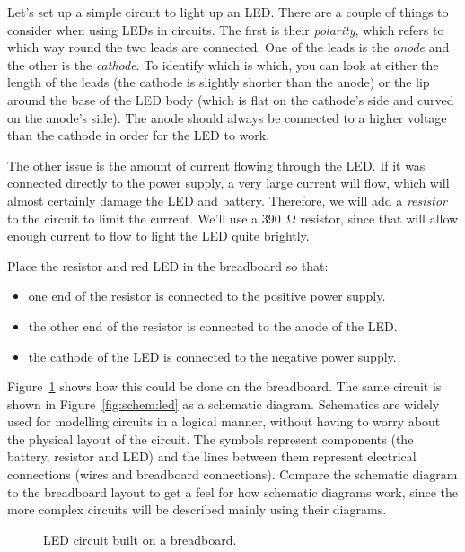 \documentclass{article}
\begin{document}
Let's set up a simple circuit to light up an LED. There are a couple of things
to consider when using LEDs in circuits. The first is their \emph{polarity},
which refers to which way round the two leads are connected. One of the leads
is the \emph{anode} and the other is the \emph{cathode}. To identify which is
which, you can look at either the length of the leads (the cathode is slightly
shorter than the anode) or the lip around the base of the LED body (which is
flat on the cathode's side and curved on the anode's side). The anode should
always be connected to a higher voltage than the cathode in order for the LED
to work.

The other issue is the amount of current flowing through the LED. If it was
connected directly to the power supply, a very large current will flow, which
will almost certainly damage the LED and battery. Therefore, we will add a
\emph{resistor} to the circuit to limit the current. We'll use a
\SI{390}{\ohm} resistor, since that will allow enough current to flow to light
the LED quite brightly.

Place the resistor and red LED in the breadboard so that:

\begin{itemize}
\item one end of the resistor is connected to the positive power supply.
\item the other end of the resistor is connected to the anode of the LED.
\item the cathode of the LED is connected to the negative power supply.
\end{itemize}

Figure~\ref{fig:breadboard:led} shows how this could be done on the breadboard.
The same circuit is shown in Figure~\ref{fig:schem:led} as a schematic diagram.
Schematics are widely used for modelling circuits in a logical manner, without
having to worry about the physical layout of the circuit. The symbols represent
components (the battery, resistor and LED) and the lines between them represent
electrical connections (wires and breadboard connections). Compare the schematic
diagram to the breadboard layout to get a feel for how schematic diagrams work,
since the more complex circuits will be described mainly using their diagrams.

\begin{figure}
\centering
{}
\caption{LED circuit built on a breadboard.}
\label{fig:breadboard:led}
\end{figure}
\end{document}

